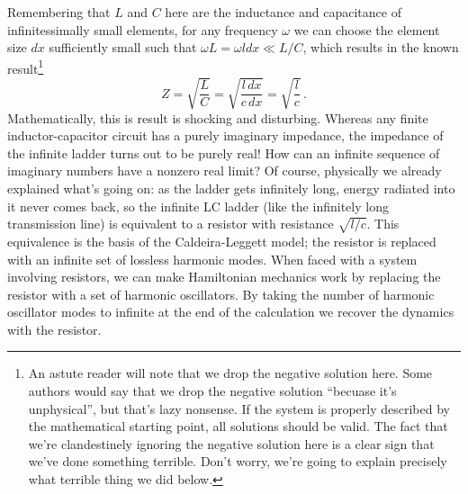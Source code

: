 Remembering that $L$ and $C$ here are the inductance and capacitance of infinitessimally small elements, for any frequency $\omega$ we can choose the element size $dx$ sufficiently small such that $\omega L = \omega \mathit{l} dx \ll L/C$, which results in the known result\footnote{An astute reader will note that we drop the negative solution here. Some authors would say that we drop the negative solution ``becuase it's unphysical'', but that's lazy nonsense. If the system is properly described by the mathematical starting point, all solutions should be valid. The fact that we're clandestinely ignoring the negative solution here is a clear sign that we've done something terrible. Don't worry, we're going to explain precisely what terrible thing we did below.}
\begin{equation}
  Z = \sqrt{\frac{L}{C}} = \sqrt{ \frac{\mathit{l} \, dx}{\mathit{c} \, dx}} = \sqrt{\frac{\mathit{l}}{\mathit{c}}} \, .
\end{equation}
Mathematically, this is result is shocking and disturbing.
Whereas any finite inductor-capacitor circuit has a purely imaginary impedance, the impedance of the infinite ladder turns out to be purely real!
How can an infinite sequence of imaginary numbers have a nonzero real limit?
Of course, physically we already explained what's going on: as the ladder gets infinitely long, energy radiated into it never comes back, so the infinite LC ladder (like the infinitely long transmission line) is equivalent to a resistor with resistance $\sqrt{\mathit{l}/\mathit{c}}$.
This equivalence is the basis of the Caldeira-Leggett model; the resistor is replaced with an infinite set of lossless harmonic modes.
When faced with a system involving resistors, we can make Hamiltonian mechanics work by replacing the resistor with a set of harmonic oscillators.
By taking the number of harmonic oscillator modes to infinite at the end of the calculation we recover the dynamics with the resistor.

